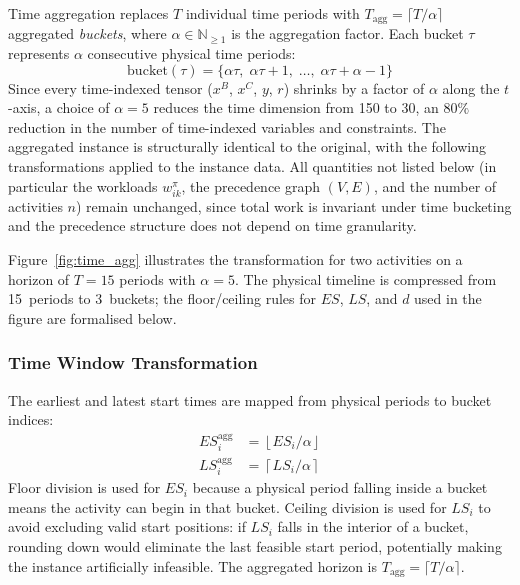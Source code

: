 Time aggregation replaces $T$ individual time periods with
$T_{\mathrm{agg}} = \lceil T / \alpha \rceil$ aggregated
\emph{buckets}, where $\alpha \in \mathbb{N}_{\geq 1}$ is the
aggregation factor. Each bucket $\tau$ represents $\alpha$
consecutive physical time periods:
\begin{equation}
    \mathrm{bucket}(\tau) =
    \{\alpha\tau,\; \alpha\tau + 1,\; \ldots,\;
      \alpha\tau + \alpha - 1\}
    \label{eq:bucket}
\end{equation}
Since every time-indexed tensor ($x^B$, $x^C$, $y$, $r$) shrinks
by a factor of $\alpha$ along the $t$-axis, a choice of
$\alpha = 5$ reduces the time dimension from 150 to 30, an $80\%$
reduction in the number of time-indexed variables and constraints.
The aggregated instance is structurally identical to the original,
with the following transformations applied to the instance data.
All quantities not listed below (in particular the workloads
$w_{ik}^{\pi}$, the precedence graph $(V, E)$, and the number of
activities $n$) remain unchanged, since total work is invariant
under time bucketing and the precedence structure does not depend
on time granularity.

Figure~\ref{fig:time_agg} illustrates the transformation for two
activities on a horizon of $T = 15$ periods with $\alpha = 5$.
The physical timeline is compressed from 15~periods to
3~buckets; the floor/ceiling rules for $ES$, $LS$, and $d$
used in the figure are formalised below.



\subsubsection*{Time Window Transformation}

The earliest and latest start times are mapped from physical
periods to bucket indices:
\begin{align}
    ES_i^{\mathrm{agg}} &= \left\lfloor ES_i / \alpha
                           \right\rfloor
    \label{eq:es_agg} \\[4pt]
    LS_i^{\mathrm{agg}} &= \left\lceil LS_i / \alpha
                           \right\rceil
    \label{eq:ls_agg}
\end{align}
Floor division is used for $ES_i$ because a physical period
falling inside a bucket means the activity can begin in that
bucket. Ceiling division is used for $LS_i$ to avoid excluding
valid start positions: if $LS_i$ falls in the interior of a
bucket, rounding down would eliminate the last feasible start
period, potentially making the instance artificially infeasible.
The aggregated horizon is $T_{\mathrm{agg}} = \lceil T / \alpha
\rceil$.

